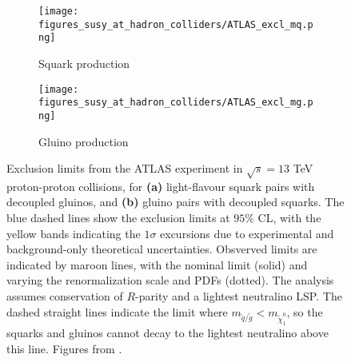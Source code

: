 \documentclass[twoside,english]{uiofysmaster}
\begin{document}
{\begin{figure}[H]
    \centering
    \begin{subfigure}[b]{0.85\textwidth}
        \texttt{[image: figures\_susy\_at\_hadron\_colliders/ATLAS\_excl\_mq.png]}
        \caption{Squark production}
    \end{subfigure}
    \begin{subfigure}[b]{0.85\textwidth}
        \texttt{[image: figures\_susy\_at\_hadron\_colliders/ATLAS\_excl\_mg.png]}
        \caption{Gluino production}
    \end{subfigure}
    \caption{Exclusion limits from the ATLAS experiment in $\sqrt{s} = 13$ TeV proton-proton collisions, for \textbf{(a)} light-flavour squark pairs with decoupled gluinos, and \textbf{(b)} gluino pairs with decoupled squarks. The blue dashed lines show the exclusion limits at $95\%$ CL, with the yellow bands indicating the $1\sigma$ excursions due to experimental and background-only theoretical uncertainties. Obsverved limits are indicated by maroon lines, with the nominal limit (solid) and varying the renormalization scale and PDFs (dotted). The analysis assumes conservation of $R$-parity and a lightest neutralino LSP. The dashed straight lines indicate the limit where $m_{\widetilde{q}/\widetilde{g}} < m_{\widetilde{\chi}^0_1}$, so the squarks and gluinos cannot decay to the lightest neutralino above this line. Figures from \cite{aaboud2016search}.}\label{Fig:: susy hadron : ATLAS exclusion limits}
\end{figure}


%
%


}
\end{document}
